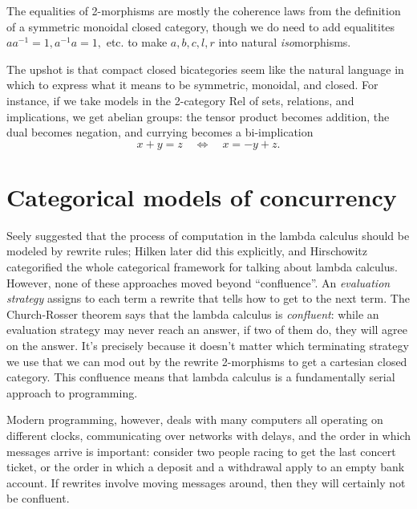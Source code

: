 \documentclass[12pt,twoside,openright]{report}
\begin{document}
The equalities of 2-morphisms are mostly the coherence laws from the definition of a symmetric monoidal closed category, though we do need to add equalitites $aa^{-1} = 1, a^{-1}a = 1,$ etc. to make $a,b,c,l,r$ into natural {\em iso}morphisms.

The upshot is that compact closed bicategories seem like the natural language in which to express what it means to be symmetric, monoidal, and closed.  For instance, if we take models in the 2-category Rel of sets, relations, and implications, we get abelian groups: the tensor product becomes addition, the dual becomes negation, and currying becomes a bi-implication
\[ x + y = z \quad \iff \quad x = -y + z. \]

\section*{Categorical models of concurrency}

Seely \cite{Seely} suggested that the process of computation in the lambda calculus should be modeled by rewrite rules; Hilken \cite{Hilken} later did this explicitly, and Hirschowitz \cite{Hirschowitz} categorified the whole categorical framework for talking about lambda calculus.  However, none of these approaches moved beyond ``confluence''.  An {\sl evaluation strategy} assigns to each term a rewrite that tells how to get to the next term.  The Church-Rosser theorem says that the lambda calculus is {\sl confluent}: while an evaluation strategy may never reach an answer, if two of them do, they will agree on the answer.  It's precisely because it doesn't matter which terminating strategy we use that we can mod out by the rewrite 2-morphisms to get a cartesian closed category.  This confluence means that lambda calculus is a fundamentally serial approach to programming.

Modern programming, however, deals with many computers all operating on different clocks, communicating over networks with delays, and the order in which messages arrive is important: consider two people racing to get the last concert ticket, or the order in which a deposit and a withdrawal apply to an empty bank account.  If rewrites involve moving messages around, then they will certainly not be confluent.
\end{document}
